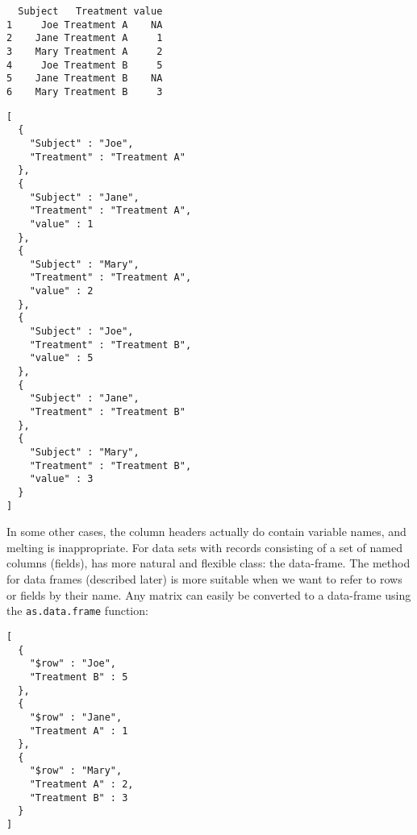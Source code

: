 \begin{knitrout}\mycodesize
{}\color{fgcolor}\begin{kframe}
\begin{alltt}
 \hlkwb{<-}   \hlstd{=} \hlstd{(}\hlstd{,} \hlstd{))}
\end{alltt}
\begin{verbatim}
  Subject   Treatment value
1     Joe Treatment A    NA
2    Jane Treatment A     1
3    Mary Treatment A     2
4     Joe Treatment B     5
5    Jane Treatment B    NA
6    Mary Treatment B     3
\end{verbatim}
\begin{alltt}
\hlstd{(}  \hlstd{=} \hlstd{))}
\end{alltt}
\begin{verbatim}
[
  {
    "Subject" : "Joe",
    "Treatment" : "Treatment A"
  },
  {
    "Subject" : "Jane",
    "Treatment" : "Treatment A",
    "value" : 1
  },
  {
    "Subject" : "Mary",
    "Treatment" : "Treatment A",
    "value" : 2
  },
  {
    "Subject" : "Joe",
    "Treatment" : "Treatment B",
    "value" : 5
  },
  {
    "Subject" : "Jane",
    "Treatment" : "Treatment B"
  },
  {
    "Subject" : "Mary",
    "Treatment" : "Treatment B",
    "value" : 3
  }
]
\end{verbatim}
\end{kframe}
\end{knitrout}


In some other cases, the column headers actually do contain variable names, and melting is inappropriate. For data sets with records consisting of a set of named columns (fields), \R has more natural and flexible class: the data-frame. The \toJSON method for data frames (described later) is more suitable when we want to refer to rows or fields by their name. Any matrix can easily be converted to a data-frame using the \texttt{as.data.frame} function:

\begin{knitrout}\mycodesize
{}\color{fgcolor}\begin{kframe}
\begin{alltt}
\hlstd{(}\hlstd{(}  \hlstd{=} \hlstd{))}
\end{alltt}
\begin{verbatim}
[
  {
    "$row" : "Joe",
    "Treatment B" : 5
  },
  {
    "$row" : "Jane",
    "Treatment A" : 1
  },
  {
    "$row" : "Mary",
    "Treatment A" : 2,
    "Treatment B" : 3
  }
]
\end{verbatim}
\end{kframe}
\end{knitrout}


